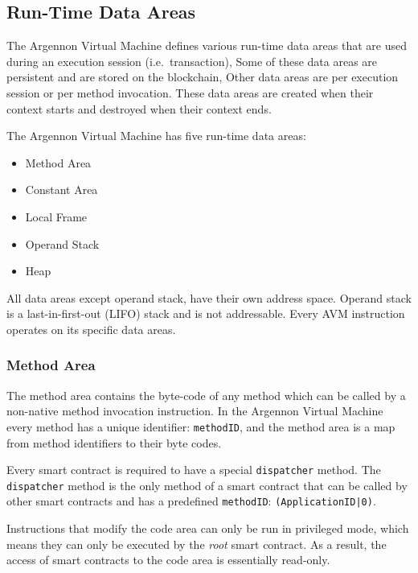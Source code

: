 \subsection{Run-Time Data Areas}\label{subsec:data-areas}

The Argennon Virtual Machine defines various run-time data areas that are used during an execution session
(i.e.\ transaction), Some of these data areas are persistent and are stored on the blockchain, Other data areas
are per execution session or per method invocation. These data areas are created when their context starts and
destroyed when their context ends.

The Argennon Virtual Machine has five run-time data areas:
\begin{itemize}
    \item Method Area
    \item Constant Area
    \item Local Frame
    \item Operand Stack
    \item Heap
\end{itemize}
All data areas except operand stack, have their own address space. Operand stack is a
last-in-first-out (LIFO) stack and is not addressable. Every AVM instruction operates on its specific
data areas.

\subsubsection{Method Area}

The method area contains the byte-code of any method which can be called by a non-native method invocation
instruction. In the Argennon Virtual Machine every method has a unique identifier:
\texttt{methodID}, and the method area is a map from method identifiers to their byte codes.

Every smart contract is required to have a special \texttt{dispatcher} method. The \texttt{dispatcher} method is the
only method of a smart contract that can be called by other smart contracts and has a
predefined \texttt{methodID}: \texttt{(ApplicationID|0)}.


Instructions that modify the code area can only be run in privileged mode, which means they can only be executed
by the \emph{root} smart contract. As a result, the access of smart contracts to the code area is essentially
read-only.

